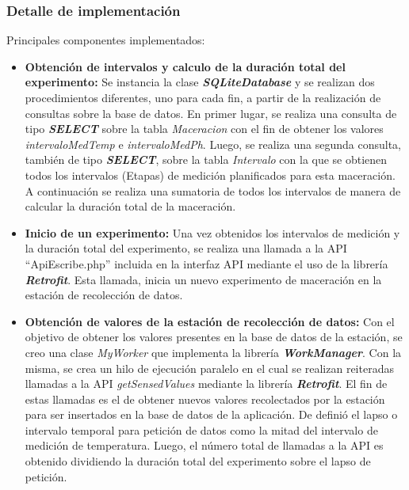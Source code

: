             \subsubsection{Detalle de implementación}
            \par Principales componentes implementados:
            \begin{itemize}
                \item  \textbf{Obtención de intervalos y calculo de la duración total del experimento:} Se instancia la clase \textbf{\textit{\gls{SQLiteDatabase}}} y se realizan dos procedimientos diferentes, uno para cada fin, a partir de la realización de consultas sobre la base de datos. En primer lugar, se realiza una consulta de tipo \textbf{\textit{\gls{SELECT}}} sobre la tabla \textit{Maceracion} con el fin de obtener los valores \textit{intervaloMedTemp} e \textit{intervaloMedPh}. Luego, se realiza una segunda consulta, también de tipo \textbf{\textit{\gls{SELECT}}}, sobre la tabla \textit{Intervalo} con la que se obtienen todos los intervalos (Etapas) de medición planificados para esta maceración. A continuación se realiza una sumatoria de todos los intervalos de manera de calcular la duración total de la maceración.
                
                \item \textbf{Inicio de un experimento:} Una vez obtenidos los intervalos de medición y la duración total del experimento, se realiza una llamada a la API ``ApiEscribe.php'' incluida en la interfaz API mediante el uso de la librería \textbf{\textit{\gls{Retrofit}}}. Esta llamada, inicia un nuevo experimento de maceración en la estación de recolección de datos.
                
                \item \textbf{Obtención de valores de la estación de recolección de datos:} Con el objetivo de obtener los valores presentes en la base de datos de la estación, se creo una clase \textit{MyWorker} que implementa la librería \textbf{\textit{\gls{WorkManager}}}. Con la misma, se crea un hilo de ejecución paralelo en el cual se realizan reiteradas llamadas a la API \textit{getSensedValues} mediante la librería \textbf{\textit{\gls{Retrofit}}}. El fin de estas llamadas es el de obtener nuevos valores recolectados por la estación para ser insertados en la base de datos de la aplicación. De definió el lapso o intervalo temporal para petición de datos como la mitad del intervalo de medición de temperatura. Luego, el número total de llamadas a la API es obtenido dividiendo la duración total del experimento sobre el lapso de petición.
                

\end{itemize}
